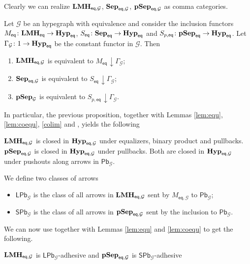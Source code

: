 \documentclass[3p]{elsarticle}
\newcommand{\pbc}{\mathsf{Pb}}
\newcommand{\pbl}{\mathsf{LPb}}
\newcommand{\pbs}{\mathsf{SPb}}
\newcommand{\eq}{\mathsf{eq}}
\newcommand{\catname}[1]{\textbf{\textup{#1}}}
\newcommand{\lmo}{\catname{LMH}}
\newcommand{\hyp}{\catname{Hyp}}
\newcommand{\pshyp}{\catname{pSep}}
\newcommand{\shyp}{\catname{Sep}}
\newcommand{\EqHyp}{\catname{Hyp}_{\mathsf{eq}}} %
\newcommand{\EqsHyp}{\catname{Sep}_{\mathsf{eq}}}
\newcommand{\Eqlmo}{\catname{LMH}_{\mathsf{eq}}}
\renewcommand{\comma}[2]{#1\hspace{1pt} {\downarrow}#2}
\theoremstyle{remark}
\theoremstyle{definition}
\begin{document}
 Clearly we can realize $\lmo_{\eq, \mathcal{G}}$, $\shyp_{\eq, \mathcal{G}}$, $\pshyp_{\eq, \mathcal{G}}$ as comma categories.
 
 \begin{prop}\label{prop:eti}
 	Let $\mathcal{G}$ be an hypegraph with equivalence and consider the inclusion functors $M_{\eq}\colon \Eqlmo\to \EqHyp$, $S_{\eq}\colon \EqsHyp \to \EqHyp$ and $S_{p, \eq}\colon \pshyp_{\eq}\to \EqHyp$. Let $\Gamma_{\mathcal{G}}\colon 1\to \EqHyp$ be the constant functor in $\mathcal{G}$. Then
 	\begin{enumerate}
 		\item $\lmo_{\eq, \mathcal{G}}$ is equivalent to $\comma{M_\eq}{\Gamma_{\mathcal{G}}}$;
 		\item $\shyp_{\eq, \mathcal{G}}$ is equivalent to $\comma{S_\eq}{\Gamma_{\mathcal{G}}}$; 
 		\item $\pshyp_{\mathcal{G}}$ is equivalent to $\comma{S_{p, \eq}}{\Gamma_{\mathcal{G}}}$. 
 	\end{enumerate}
 \end{prop}
 
 In particular, the previous  proposition, together with Lemmas \ref{lem:equ}, \ref{lem:coequ}, \ref{colim} and , yields the following
 
 \begin{cor}\label{cor:eti}
 $\lmo_{\eq, \mathcal{G}}$ is closed in $\hyp_{\eq, \mathcal{G}}$ under equalizers, binary product and pullbacks. $\pshyp_{\eq, \mathcal{G}}$ is closed in $\hyp_{\eq, \mathcal{G}}$ under pullbacks. Both are closed in  $\hyp_{\eq, \mathcal{G}}$ under pushouts along arrows in $\pbc_{\mathcal{G}}$.
 \end{cor}

\begin{defi}We define two classes of arrows
	\begin{itemize}
		\item $\pbl_{\mathcal{G}}$ is the class of all arrows in $\lmo_{\eq, \mathcal{G}}$ sent by $M_{\eq, \mathcal{G}}$ to $\pbc_{\mathcal{G}}$;
		\item $\pbs_{\mathcal{G}}$ is the class of all arrows in $\pshyp_{\eq, \mathcal{G}}$ sent by the inclusion  to $\pbc_{\mathcal{G}}$.
	\end{itemize}
\end{defi}

We can  now use  together with Lemmas \ref{lem:equ} and \ref{lem:coequ} to get the following.

\begin{cor}$\lmo_{\eq, \mathcal{G}}$ is $\pbl_{\mathcal{G}}$-adhesive and $\pshyp_{\eq, \mathcal{G}}$ is $\pbs_{\mathcal{G}}$-adhesive
\end{cor}
\end{document}
